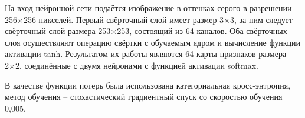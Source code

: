 На вход нейронной сети подаётся изображение в оттенках серого в разрешении 256×256 пикселей. Первый свёрточный слой имеет размер 3×3, за ним следует свёрточный слой размера 253×253, состоящий из 64 каналов. Оба свёрточных слоя осуществляют операцию свёртки с обучаемым ядром и вычисление функции активации tanh. Результатом их работы являются 64 карты признаков размера 2×2, соединённые с двумя нейронами с функцией активации softmax.

В качестве функции потерь была использована категориальная кросс-энтропия, метод обучения – стохастический градиентный спуск со скоростью обучения 0,005.
\clearpage